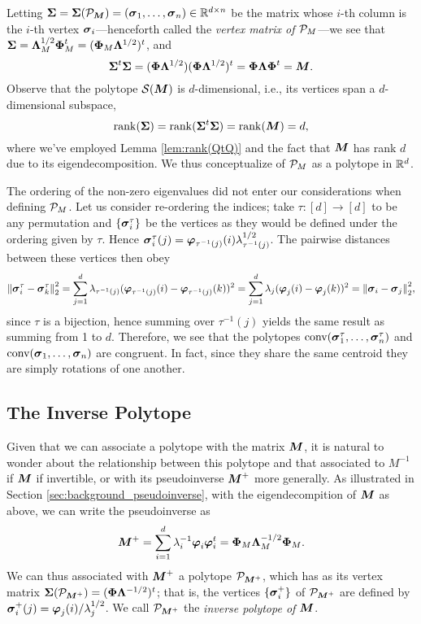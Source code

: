 Letting $\Sv=\Sv(\pol_\M)=(\sv_1,\dots,\sv_n)\in \R^{d\times n}$ be the matrix whose $i$-th column is the $i$-th vertex $\sv_i$---henceforth called the \emph{vertex matrix of $\P_M$}---we see that 
$ \Sv=\Eval_M^{1/2}\Eig_M^\tp=(\Eig_M\Eval^{1/2})^\tp$, and 
\begin{equation*}
    \Sv^\tp \Sv=(\Eig\Eval^{1/2}) (\Eig\Eval^{1/2})^\tp = \Eig \Eval\Eig^\tp =\M.
\end{equation*}
Observe that the polytope $\splx(\M)$ is $d$-dimensional, i.e., its vertices span a $d$-dimensional subspace,
\[\rank(\Sv)=\rank(\Sv^\tp \Sv)=\rank(\M)=d,\]
where we've employed Lemma \ref{lem:rank(QtQ)} and the fact that $\M$ has rank $d$ due to its eigendecomposition. We thus conceptualize of $\P_M$ as a polytope in $\R^d$. 

\begin{remark}
	The ordering of the non-zero eigenvalues did not enter our considerations when defining $\P_M$. Let us consider re-ordering the indices; take $\tau:[d]\to[d]$ to be any permutation and $\{\sv_i^\tau\}$ be the vertices as they would be defined under the ordering given by $\tau$. Hence $\sv_i^\tau(j) = \vp_{\tau^{-1}(j)}(i)\lambda_{\tau^{-1}(j)}^{1/2}$. The pairwise distances between these vertices then obey 
	\begin{equation*}
	\norm{\sv_i^\tau-\sv_k^\tau}_2^2 = \sum_{j=1}^d \lambda_{\tau^{-1}(j)} (\vp_{\tau^{-1}(j)}(i)-\vp_{\tau^{-1}(j)}(k))^2 = \sum_{j=1}^d \lambda_{j} (\vp_{j}(i)-\vp_{j}(k))^2 = \norm{\sv_i-\sv_j}_2^2,
	\end{equation*}
	since $\tau$ is a bijection, hence summing over $\tau^{-1}(j)$ yields the same result as summing from 1 to $d$. 
	Therefore, we see that the polytopes $\conv(\sv_1^\tau,\dots,\sv_n^\tau)$ and  $\conv(\sv_1,\dots,\sv_n)$ are congruent. In fact, since they share the same centroid they are simply rotations of one another. 
\end{remark}


\subsection{The Inverse Polytope} 
\label{sec:inverse_polytope}
Given that we can associate a polytope with the matrix $\M$, it is natural to wonder about the relationship between this polytope and that associated to $M^{-1}$ if $\M$ if invertible, or with its pseudoinverse $\M^+$ more generally. As illustrated in Section \ref{sec:background_pseudoinverse}, with the eigendecompition of $\M$ as above, we can write  the pseudoinverse as 
\[\M^+=\sum_{i=1}^d \lambda_i^{-1} \eig_i\eig_i^\tp = \Eig_M \Eval_M^{-1/2}\Eig_M.\]
We can thus associated with $\M^+$ a polytope $\pol_{\M^+}$, which has as its vertex matrix $\Sv(\pol_{\M^+})=(\Eig\Eval^{-1/2})^\tp$; that is, the vertices $\{\sv_i^+\}$ of $\pol_{\M^+}$ are defined by 
$\sv_i^+(j)=\eig_j(i)/\lambda_j^{1/2}$. We call $\pol_{\M^+}$ the \emph{inverse polytope of $\M$}. 

